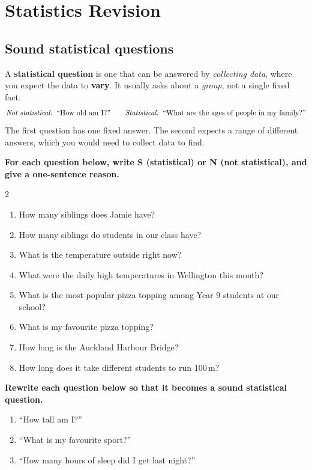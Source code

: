 \documentclass[11pt]{article}
\newcommand{\ans}{\hrulefill}
\newcommand{\anshere}{\par\vspace{0.4em}\noindent\ans\par\vspace{0.4em}}
\begin{document}
\newpage

\section{Statistics Revision}

\subsection*{Sound statistical questions}
\noindent A \textbf{statistical question} is one that can be answered by \emph{collecting data},
where you expect the data to \textbf{vary}. It usually asks about a \emph{group}, not a single
fixed fact.
\[
  \text{\emph{Not statistical:}} \;\; \text{``How old am I?''} \qquad
  \text{\emph{Statistical:}} \;\; \text{``What are the ages of people in my family?''}
\]
The first question has one fixed answer. The second expects a range of different answers, which
you would need to collect data to find.

\vspace{0.4em}
\noindent\textbf{For each question below, write S (statistical) or N (not statistical), and
give a one-sentence reason.}

\begin{multicols}{2}
\begin{enumerate}[label=(\alph*)]
  \item How many siblings does Jamie have?
  \anshere
  \item How many siblings do students in our class have?
  \anshere
  \item What is the temperature outside right now?
  \anshere
  \item What were the daily high temperatures in Wellington this month?
  \anshere
  \item What is the most popular pizza topping among Year 9 students at our school?
  \anshere
  \item What is my favourite pizza topping?
  \anshere
  \item How long is the Auckland Harbour Bridge?
  \anshere
  \item How long does it take different students to run $100$\,m?
  \anshere
\end{enumerate}
\end{multicols}

\vspace{0.3em}
\noindent\textbf{Rewrite each question below so that it becomes a sound statistical question.}
\begin{enumerate}[label=(\alph*)]
  \item ``How tall am I?''
  \anshere
  \item ``What is my favourite sport?''
  \anshere
  \item ``How many hours of sleep did I get last night?''
  \anshere
\end{enumerate}
\end{document}
